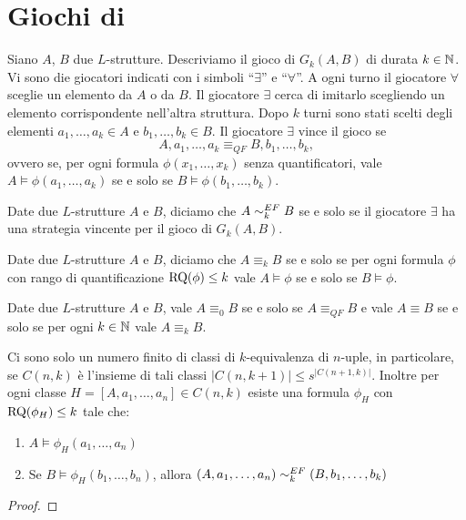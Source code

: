 \section{Giochi di \EFl{}}
\label{sec:EF}
\begin{definizione}
 Siano $A$, $B$ due $L$-strutture. Descriviamo
 il gioco di \EFl{} $G_k(A,B)$ di durata $k \in \mathbb{N}$. Vi sono die giocatori
 indicati con i simboli ``$\exists$'' e ``$\forall$''. A ogni turno
 il giocatore $\forall$ sceglie un elemento da $A$ o da $B$. Il giocatore
 $\exists$ cerca di imitarlo scegliendo un elemento corrispondente nell'altra
 struttura. Dopo $k$ turni sono stati scelti degli elementi
 $a_1, \ldots, a_k \in A$ e $b_1, \ldots, b_k \in B$. Il giocatore $\exists$
 vince il gioco se
 \[ A, a_1, \ldots, a_k \equiv_{QF} B, b_1, \ldots, b_k,\]
 ovvero se, per ogni formula $\phi(x_1, \ldots, x_k)$ senza quantificatori, vale
 $A \models \phi(a_1, \ldots, a_k)$ se e solo se $B \models \phi(b_1, \ldots, b_k)$.
\end{definizione}

\begin{definizione}
 Date due $L$-strutture $A$ e $B$, diciamo che $A \sim^{EF}_k B$ se e solo se
 il giocatore $\exists$ ha una strategia vincente per il gioco di \EF{} $G_k(A,B)$.
\end{definizione}

\begin{definizione}
 Date due $L$-strutture $A$ e $B$, diciamo che $A \equiv_k B$ se e solo se
 per ogni formula $\phi$ con rango di quantificazione $\operatorname{RQ}(\phi) \leq k$ vale
 $A \models \phi$ se e solo se $B \models \phi$.
\end{definizione}

\begin{osservazione}
 Date due $L$-strutture $A$ e $B$, vale $A \equiv_0 B$ se e solo se
 $A \equiv_{QF} B$ e vale $A \equiv B$ se e solo se per ogni $k \in \mathbb{N}$ vale
 $A \equiv_k B$.
\end{osservazione}

\begin{lemma}
\label{lemma:finite-formulas}
 Ci sono solo un numero finito di classi di $k$-equivalenza di $n$-uple,
 in particolare, se $C(n,k)$
 è l'insieme di tali classi $|C(n,k+1)| \leq s^{|C(n+1,k)|}$. Inoltre per ogni
 classe $H=[A,a_1,\ldots,a_n] \in C(n,k)$ esiste una formula $\phi_H$
 con $\operatorname{RQ}(\phi_H) \leq k$ tale che:
 \begin{enumerate}
  \item $A \models \phi_H(a_1, \ldots, a_n)$
  \item Se $B \models \phi_H(b_1,\ldots,b_n)$, allora $(A,a_1,\ldots, a_n) \sim^{EF}_k (B,b_1,\ldots,b_k)$
 \end{enumerate}
\end{lemma}
\begin{proof}
\end{proof}

